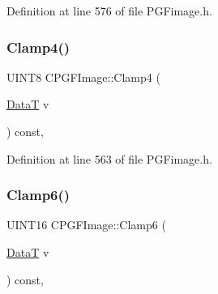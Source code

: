 Definition at line 576 of file P\+G\+Fimage.\+h.


\begin{DoxyCode}{0}

\end{DoxyCode}
\mbox{\label{classCPGFImage_adc3d79612346af8109230039b1077c46}} 
\subsubsection{\texorpdfstring{Clamp4()}{Clamp4()}}
{\footnotesize\ttfamily U\+I\+N\+T8 C\+P\+G\+F\+Image\+::\+Clamp4 (\begin{DoxyParamCaption}\item[{\mbox{\hyperlink{PGFtypes_8h_acb1ee3f52ccfad782dcaa0abd79e5d05}{DataT}}}]{v }\end{DoxyParamCaption}) const\hspace{0.3cm}{\ttfamily [inline]}, {\ttfamily [private]}}



Definition at line 563 of file P\+G\+Fimage.\+h.


\begin{DoxyCode}{0}

\end{DoxyCode}
\mbox{\label{classCPGFImage_a15adcf6db4b6c3f60db26c7809b0bd54}} 
\subsubsection{\texorpdfstring{Clamp6()}{Clamp6()}}
{\footnotesize\ttfamily U\+I\+N\+T16 C\+P\+G\+F\+Image\+::\+Clamp6 (\begin{DoxyParamCaption}\item[{\mbox{\hyperlink{PGFtypes_8h_acb1ee3f52ccfad782dcaa0abd79e5d05}{DataT}}}]{v }\end{DoxyParamCaption}) const\hspace{0.3cm}{\ttfamily [inline]}, {\ttfamily [private]}}



